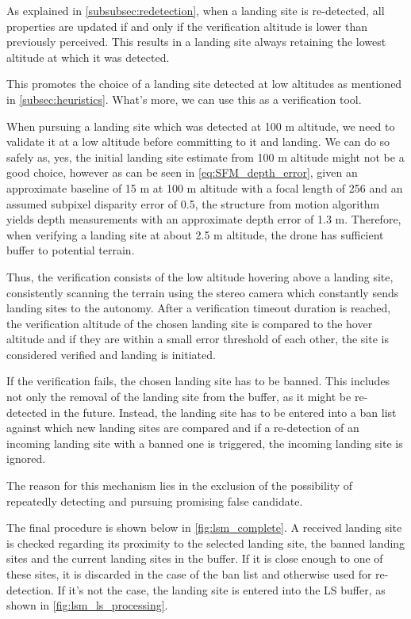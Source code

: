 As explained in \cref{subsubsec:redetection}, when a landing site is re-detected, all properties are updated if and only if the verification altitude is lower than previously perceived. This results in a landing site always retaining the lowest altitude at which it was detected.

This promotes the choice of a landing site detected at low altitudes as mentioned in \cref{subsec:heuristics}. What's more, we can use this as a verification tool.

When pursuing a landing site which was detected at 100 m altitude, we need to validate it at a low altitude before committing to it and landing. We can do so safely as, yes, the initial landing site estimate from 100 m altitude might not be a good choice, however as can be seen in \cref{eq:SFM_depth_error}, given an approximate baseline of 15 m at 100 m altitude with a focal length of 256 and an assumed subpixel disparity error of 0.5, the structure from motion algorithm yields depth measurements with an approximate depth error of 1.3 m. Therefore, when verifying a landing site at about 2.5 m altitude, the drone has sufficient buffer to potential terrain.

Thus, the verification consists of the low altitude hovering above a landing site, consistently scanning the terrain using the stereo camera which constantly sends landing sites to the autonomy. After a verification timeout duration is reached, the verification altitude of the chosen landing site is compared to the hover altitude and if they are within a small error threshold of each other, the site is considered verified and landing is initiated.

If the verification fails, the chosen landing site has to be banned. This includes not only the removal of the landing site from the buffer, as it might be re-detected in the future. Instead, the landing site has to be entered into a ban list against which new landing sites are compared and if a re-detection of an incoming landing site with a banned one is triggered, the incoming landing site is ignored. 

The reason for this mechanism lies in the exclusion of the possibility of repeatedly detecting and pursuing promising false candidate.

The final procedure is shown below in \cref{fig:lsm_complete}. A received landing site is checked regarding its proximity to the selected landing site, the banned landing sites and the current landing sites in the buffer. If it is close enough to one of these sites, it is discarded in the case of the ban list and otherwise used for re-detection. If it's not the case, the landing site is entered into the LS buffer, as shown in \cref{fig:lsm_ls_processing}.

